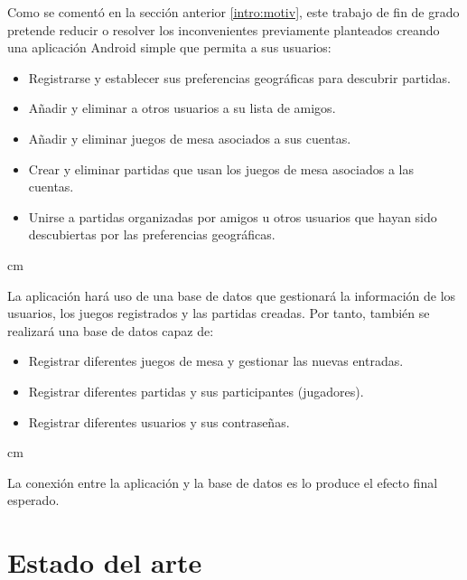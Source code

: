 
        Como se comentó en la sección anterior \ref{intro:motiv}, este trabajo de fin de grado pretende reducir o resolver los inconvenientes previamente planteados creando una aplicación Android simple que permita a sus usuarios:

        \begin{itemize}

            \item Registrarse y establecer sus preferencias geográficas para descubrir partidas.
            \item Añadir y eliminar a otros usuarios a su lista de amigos.
            \item Añadir y eliminar juegos de mesa asociados a sus cuentas.
            \item Crear y eliminar partidas que usan los juegos de mesa asociados a las cuentas.
            \item Unirse a partidas organizadas por amigos u otros usuarios que hayan sido descubiertas por las preferencias geográficas.

        \end{itemize}

         cm

        La aplicación hará uso de una base de datos que gestionará la información de los usuarios, los juegos registrados y las partidas creadas. Por tanto, también se realizará una base de datos capaz de:

        \begin{itemize}

            \item Registrar diferentes juegos de mesa y gestionar las nuevas entradas.
            \item Registrar diferentes partidas y sus participantes (jugadores).
            \item Registrar diferentes usuarios y sus contraseñas.

        \end{itemize}

         cm

        La conexión entre la aplicación y la base de datos es lo produce el efecto final esperado.

        \newpage


    \section{Estado del arte}

